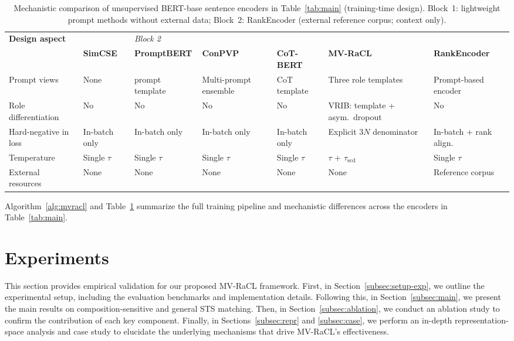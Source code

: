 \documentclass[lettersize,journal]{IEEEtran}
\begin{document}
\begin{table}[!htbp]
\centering
\caption{Mechanistic comparison of unsupervised BERT-base sentence encoders in Table~\ref{tab:main} (training-time design). Block~1: lightweight prompt methods without external data; Block~2: RankEncoder (external reference corpus; context only).}
\label{tab:mech-compare}
\footnotesize
\setlength{\tabcolsep}{4pt}
\renewcommand{\arraystretch}{1.12}
\begin{tabular*}{\linewidth}{@{\extracolsep{\fill}}>{\raggedright\arraybackslash}p{}*{6}{>{\raggedright\arraybackslash}p{}}@{}}
\toprule
\textbf{Design aspect} & \multicolumn{5}{c}{\textit{Block 1 --- Lightweight unsupervised prompt methods (no external data)}} & \textit{Block 2} \\
\cmidrule(lr){2-6}\cmidrule(lr){7-7}
 & \textbf{SimCSE} & \textbf{PromptBERT} & \textbf{ConPVP} & \textbf{CoT-BERT} & \textbf{MV-RaCL} & \textbf{RankEncoder} \\
\midrule
Prompt views & None & prompt template & Multi-prompt ensemble & CoT template & Three role templates & Prompt-based encoder \\
Role differentiation & No & No & No & No & VRIB: template + asym.\ dropout & No \\
Hard-negative in loss & In-batch only & In-batch only & In-batch only & In-batch only & Explicit $3N$ denominator & In-batch + rank align. \\
Temperature & Single $\tau$ & Single $\tau$ & Single $\tau$ & Single $\tau$ & $\tau$ + $\tau_{\mathrm{scd}}$ & Single $\tau$ \\
External resources & None & None & None & None & None & Reference corpus \\
\bottomrule
\end{tabular*}
\end{table}

Algorithm~\ref{alg:mvracl} and Table~\ref{tab:mech-compare} summarize the full training pipeline and mechanistic differences across the encoders in Table~\ref{tab:main}.

\section{Experiments}
\label{sec:exp}

This section provides empirical validation for our proposed MV-RaCL framework. First, in Section~\ref{subsec:setup-exp}, we outline the experimental setup, including the evaluation benchmarks and implementation details. Following this, in Section~\ref{subsec:main}, we present the main results on composition-sensitive and general STS matching. Then, in Section~\ref{subsec:ablation}, we conduct an ablation study to confirm the contribution of each key component. Finally, in Sections~\ref{subsec:repr} and \ref{subsec:case}, we perform an in-depth representation-space analysis and case study to elucidate the underlying mechanisms that drive MV-RaCL's effectiveness.
\end{document}
